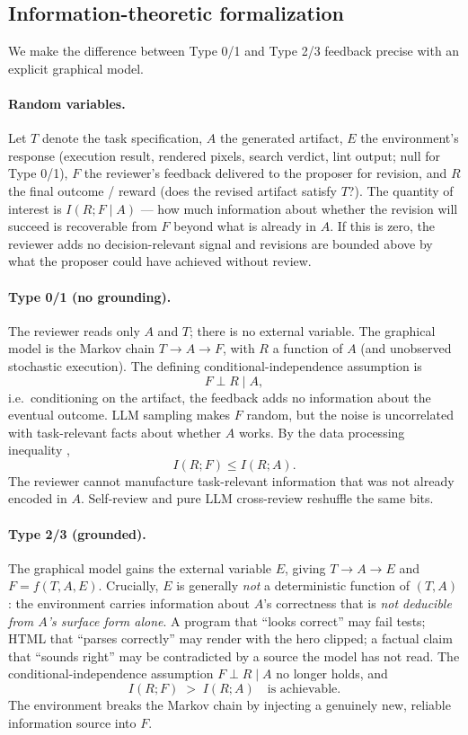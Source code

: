 \documentclass[11pt]{article}
\begin{document}
\subsection{Information-theoretic formalization}
\label{sec:formalization}

We make the difference between Type 0/1 and Type 2/3 feedback precise with an explicit graphical model.

\paragraph{Random variables.} Let $T$ denote the task specification, $A$ the generated artifact, $E$ the environment's response (execution result, rendered pixels, search verdict, lint output; null for Type 0/1), $F$ the reviewer's feedback delivered to the proposer for revision, and $R$ the final outcome / reward (does the revised artifact satisfy $T$?). The quantity of interest is $I(R; F \mid A)$ --- how much information about whether the revision will succeed is recoverable from $F$ beyond what is already in $A$. If this is zero, the reviewer adds no decision-relevant signal and revisions are bounded above by what the proposer could have achieved without review.

\paragraph{Type 0/1 (no grounding).} The reviewer reads only $A$ and $T$; there is no external variable. The graphical model is the Markov chain $T \to A \to F$, with $R$ a function of $A$ (and unobserved stochastic execution). The defining conditional-independence assumption is
\[
F \perp R \mid A,
\]
i.e.\ conditioning on the artifact, the feedback adds no information about the eventual outcome. LLM sampling makes $F$ random, but the noise is uncorrelated with task-relevant facts about whether $A$ works. By the data processing inequality \citep{cover2006elements},
\[
I(R; F) \leq I(R; A).
\]
The reviewer cannot manufacture task-relevant information that was not already encoded in $A$. Self-review and pure LLM cross-review reshuffle the same bits.

\paragraph{Type 2/3 (grounded).} The graphical model gains the external variable $E$, giving $T \to A \to E$ and $F = f(T, A, E)$. Crucially, $E$ is generally \emph{not} a deterministic function of $(T, A)$: the environment carries information about $A$'s correctness that is \emph{not deducible from $A$'s surface form alone}. A program that ``looks correct'' may fail tests; HTML that ``parses correctly'' may render with the hero clipped; a factual claim that ``sounds right'' may be contradicted by a source the model has not read. The conditional-independence assumption $F \perp R \mid A$ no longer holds, and
\[
I(R; F) \;>\; I(R; A) \quad\text{is achievable}.
\]
The environment breaks the Markov chain by injecting a genuinely new, reliable information source into $F$.
\end{document}
